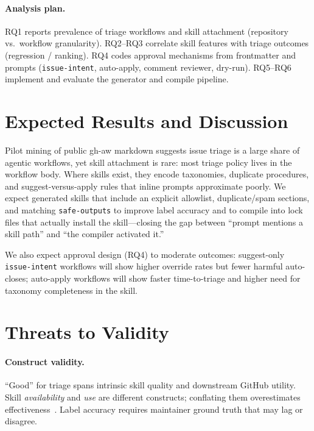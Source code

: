 \documentclass[sigconf,review,anonymous]{acmart}
\begin{document}
\paragraph{Analysis plan.}
RQ1 reports prevalence of triage workflows and skill attachment (repository vs.\
workflow granularity).
RQ2--RQ3 correlate skill features with triage outcomes (regression / ranking).
RQ4 codes approval mechanisms from frontmatter and prompts
(\texttt{issue-intent}, auto-apply, comment reviewer, dry-run).
RQ5--RQ6 implement and evaluate the generator and compile pipeline.


\section{Expected Results and Discussion}
\label{sec:results}


Pilot mining of public gh-aw markdown suggests issue triage is a large share of
agentic workflows, yet skill attachment is rare: most triage policy lives in the
workflow body.
Where skills exist, they encode taxonomies, duplicate procedures, and
suggest-versus-apply rules that inline prompts approximate poorly.
We expect generated skills that include an explicit allowlist, duplicate/spam
sections, and matching \texttt{safe-outputs} to improve label accuracy and to
compile into lock files that actually install the skill---closing the gap
between ``prompt mentions a skill path'' and ``the compiler activated it.''

We also expect approval design (RQ4) to moderate outcomes: suggest-only
\texttt{issue-intent} workflows will show higher override rates but fewer
harmful auto-closes; auto-apply workflows will show faster time-to-triage and
higher need for taxonomy completeness in the skill.

\section{Threats to Validity}
\label{sec:threats}

\paragraph{Construct validity.}
``Good'' for triage spans intrinsic skill quality and downstream GitHub utility.
Skill \emph{availability} and \emph{use} are different constructs; conflating
them overestimates effectiveness~\cite{copilotAboutSkills2026}.
Label accuracy requires maintainer ground truth that may lag or disagree.
\end{document}
